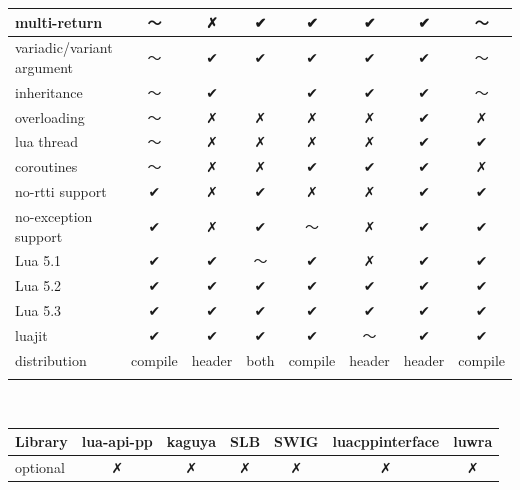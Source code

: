 \documentclass[conference,compsoc]{IEEEtran}
\begin{document}
\begin{table}[ht!]
\begin{tabular}{l c c c c c c c }
		\\ \hline
		multi-return              &      〜      &     ✗      &     ✔    &    ✔    &     ✔    &     ✔     &     〜     
		\\ \hline
		variadic/variant argument &      〜      &     ✔      &     ✔    &    ✔    &     ✔    &     ✔     &     〜     
		\\ \hline
		inheritance               &      〜      &     ✔      &     ~    &    ✔    &     ✔    &     ✔     &     〜     
		\\ \hline
		overloading               &      〜      &     ✗      &     ✗    &    ✗    &     ✗    &     ✔     &     ✗     
		\\ \hline
		lua thread                &      〜      &     ✗      &     ✗    &    ✗    &     ✗    &     ✔     &     ✔     
		\\ \hline
		coroutines                &      〜      &     ✗      &     ✗    &    ✔    &     ✔    &     ✔     &     ✗     
		\\ \hline
		no-rtti support           &      ✔      &     ✗      &     ✔    &    ✗    &     ✗    &     ✔     &     ✔     
		\\ \hline
		no-exception support      &      ✔      &     ✗      &     ✔    &    〜    &     ✗    &     ✔     &     ✔     
		\\ \hline
		Lua 5.1                   &      ✔      &     ✔      &     〜    &    ✔    &     ✗    &     ✔     &     ✔     
		\\ \hline
		Lua 5.2                   &      ✔      &     ✔      &     ✔    &    ✔    &     ✔    &     ✔     &     ✔     
		\\ \hline
		Lua 5.3                   &      ✔      &     ✔      &     ✔    &    ✔    &     ✔    &     ✔     &     ✔     
		\\ \hline
		luajit                    &      ✔      &     ✔      &     ✔    &    ✔    &     〜    &     ✔     &     ✔     
		\\ \hline
		distribution              &   compile   &    header  &   both   & compile &  header  &   header  &  compile 
		\\ \hline \\
	\end{tabular}
	\\
	\begin{tabular}{l c c c c c c }
		Library                   &   lua-api-pp   &  kaguya  &    SLB   &    SWIG   & luacppinterface & luwra
		\\ \hline \hline
		optional                  &        ✗       &     ✗    &     ✗    &     ✗     &        ✗        &    ✗

\end{tabular}
\end{table}
\end{document}
